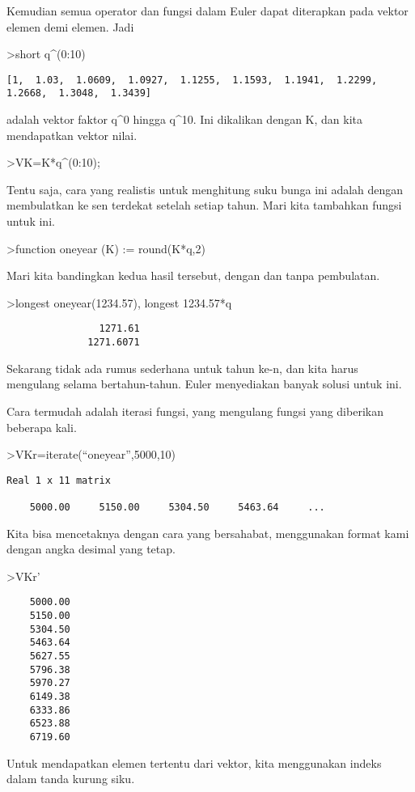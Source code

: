 \documentclass[
]{book}
\begin{document}
Kemudian semua operator dan fungsi dalam Euler dapat diterapkan pada vektor elemen demi elemen. Jadi

\textgreater short q\^{}(0:10)

\begin{verbatim}
[1,  1.03,  1.0609,  1.0927,  1.1255,  1.1593,  1.1941,  1.2299,
1.2668,  1.3048,  1.3439]
\end{verbatim}

adalah vektor faktor q\^{}0 hingga q\^{}10. Ini dikalikan dengan K, dan kita mendapatkan vektor nilai.

\textgreater VK=K*q\^{}(0:10);

Tentu saja, cara yang realistis untuk menghitung suku bunga ini adalah dengan membulatkan ke sen terdekat setelah setiap tahun. Mari kita tambahkan fungsi untuk ini.

\textgreater function oneyear (K) := round(K*q,2)

Mari kita bandingkan kedua hasil tersebut, dengan dan tanpa pembulatan.

\textgreater longest oneyear(1234.57), longest 1234.57*q

\begin{verbatim}
                1271.61 
              1271.6071 
\end{verbatim}

Sekarang tidak ada rumus sederhana untuk tahun ke-n, dan kita harus mengulang selama bertahun-tahun. Euler menyediakan banyak solusi untuk ini.

Cara termudah adalah iterasi fungsi, yang mengulang fungsi yang diberikan beberapa kali.

\textgreater VKr=iterate(``oneyear'',5000,10)

\begin{verbatim}
Real 1 x 11 matrix

    5000.00     5150.00     5304.50     5463.64     ...
\end{verbatim}

Kita bisa mencetaknya dengan cara yang bersahabat, menggunakan format kami dengan angka desimal yang tetap.

\textgreater VKr'

\begin{verbatim}
    5000.00 
    5150.00 
    5304.50 
    5463.64 
    5627.55 
    5796.38 
    5970.27 
    6149.38 
    6333.86 
    6523.88 
    6719.60 
\end{verbatim}

Untuk mendapatkan elemen tertentu dari vektor, kita menggunakan indeks dalam tanda kurung siku.
\end{document}
